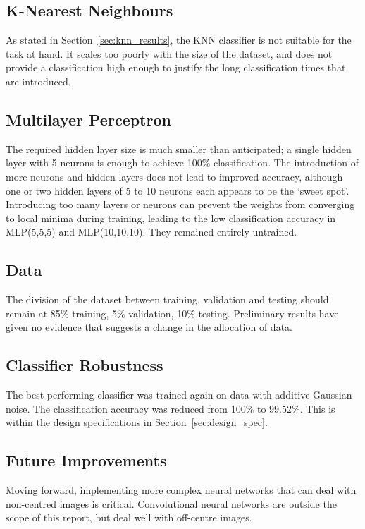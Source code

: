 \subsection{K-Nearest Neighbours}
As stated in Section~\ref{sec:knn_results}, the KNN classifier is not suitable for the task at hand. It scales too poorly with the size of the dataset, and does not provide a classification high enough to justify the long classification times that are introduced.

\subsection{Multilayer Perceptron}

The required hidden layer size is much smaller than anticipated; a single hidden layer with 5 neurons is enough to achieve 100\% classification. The introduction of more neurons and hidden layers does not lead to improved accuracy, although one or two hidden layers of 5 to 10 neurons each appears to be the `sweet spot'. Introducing too many layers or neurons can prevent the weights from converging to local minima during training, leading to the low classification accuracy in MLP(5,5,5) and  MLP(10,10,10). They remained entirely untrained.

\subsection{Data}
The division of the dataset between training, validation and testing should remain at 85\% training, 5\% validation, 10\% testing. Preliminary results have given no evidence that suggests a change in the allocation of data.

\subsection{Classifier Robustness}
The best-performing classifier was trained again on data with additive Gaussian noise. The classification accuracy was reduced from 100\% to 99.52\%. This is within the design specifications in Section~\ref{sec:design_spec}.

\subsection{Future Improvements}
Moving forward, implementing more complex neural networks that can deal with non-centred images is critical. Convolutional neural networks are outside the scope of this report, but deal well with off-centre images.

